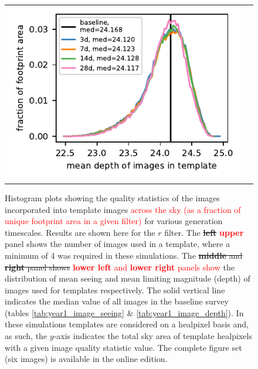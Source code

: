 \documentclass[preprintm,linenumbers]{aastex631}
\providecommand{\red}[1]{\textcolor{red}{#1}}
\begin{document}
\begin{figure}
\begin{tabular}{@{}c@{}c@{}}
	\includegraphics{results/histograms_templates_tscale/hist_first_year_one_snap_v4_0_10yrs_db_noDD_noTwi_doALLTemplateMetrics_reduceDepthTemplate_r_noDD_noTwi.pdf} \\
	
\end{tabular}
			\caption{
				Histogram plots showing the quality statistics of the images incorporated into template images \red{across the sky (as a fraction of unique footprint area in a given filter)} for various generation timescales.
				Results are shown here for the $r$ filter.
				The \sout{\textbf{left}} \red{\textbf{upper}} panel shows the number of images used in a template, where a minimum of 4 was required in these simulations. %
				The \sout{\textbf{middle} and \textbf{right} panel shows} \red{\textbf{lower left} and \textbf{lower right} panels show}   the distribution of mean seeing and mean limiting magnitude (depth) of images used for templates respectively.
				The solid vertical line indicates the median value of all images in the baseline survey (tables \ref{tab:year1_image_seeing} \& \ref{tab:year1_image_depth}).
				In these simulations templates are considered on a healpixel basis and, as such, the $y$-axis indicates the total sky area of template healpixels with a given image quality statistic value. The complete figure set (six images) is available in the online edition.
			}
			\label{fig:template_image_histograms_tscale}
		\end{figure}
		
\end{document}
